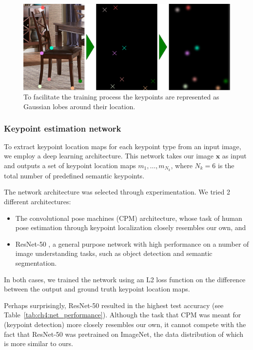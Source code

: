 \documentclass[10pt,twocolumn,letterpaper]{article}
\newcommand{\bb}[1]{{\bm{#1}}}
\begin{document}
\begin{figure}
    \includegraphics[width=\linewidth]{figures/gaussian_lobes/gaussian_lobes}
    \caption[Gaussian lobes]{To facilitate the training process the keypoints are represented as Gaussian lobes around their location.}
    \label{fig:ch4:keypoint_lobes}
\end{figure}

\subsubsection{Keypoint estimation network}
To extract keypoint location maps for each keypoint type from an input image,
we employ a deep learning architecture.  This network takes our image $\bb{x}$ as
input and outputs a set of keypoint location maps $m_1, \ldots, m_{N_k}$, where
$N_k = 6$ is the total number of predefined semantic keypoints.

The network architecture was selected through experimentation. We tried 2 different architectures:
\begin{itemize}
    \item The convolutional pose machines (CPM) \cite{Wei:2016:CVPR} architecture,
          whose task of human pose estimation through keypoint localization closely resembles our own, and
    \item ResNet-50 \cite{He:2016:CVPR}, a general purpose network with high
          performance on a number of image understanding tasks, such as object detection and semantic segmentation.
\end{itemize}
In both cases, we trained the network using an L2 loss function on the difference between
the output and ground truth keypoint location maps.

Perhaps surprisingly, ResNet-50 resulted in the highest test accuracy (see
Table~\ref{tab:ch4:net_performance}).  Although the task that CPM was meant for
(keypoint detection) more closely resembles our own, it cannot compete with the
fact that ResNet-50 was pretrained on ImageNet, the data distribution of which
is more similar to ours.
\end{document}
